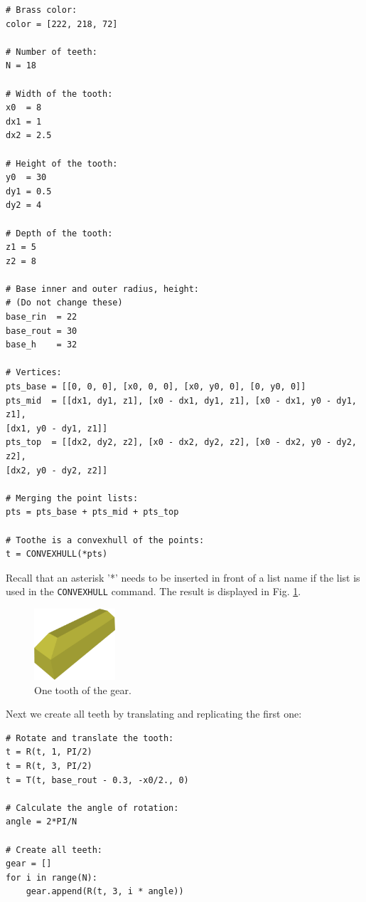 {\small
\begin{bbox}
\begin{verbatim}
# Brass color:
color = [222, 218, 72]

# Number of teeth:
N = 18

# Width of the tooth:
x0  = 8
dx1 = 1
dx2 = 2.5

# Height of the tooth:
y0  = 30
dy1 = 0.5
dy2 = 4

# Depth of the tooth:
z1 = 5
z2 = 8

# Base inner and outer radius, height:
# (Do not change these)
base_rin  = 22
base_rout = 30
base_h    = 32

# Vertices:
pts_base = [[0, 0, 0], [x0, 0, 0], [x0, y0, 0], [0, y0, 0]]
pts_mid  = [[dx1, dy1, z1], [x0 - dx1, dy1, z1], [x0 - dx1, y0 - dy1, z1], 
[dx1, y0 - dy1, z1]]
pts_top  = [[dx2, dy2, z2], [x0 - dx2, dy2, z2], [x0 - dx2, y0 - dy2, z2], 
[dx2, y0 - dy2, z2]]

# Merging the point lists:
pts = pts_base + pts_mid + pts_top

# Toothe is a convexhull of the points:
t = CONVEXHULL(*pts)
\end{verbatim}
\end{bbox}
}
\vspace{6mm}

\noindent
{}
\noindent
Recall that an asterisk '*' needs to be inserted in front of a list 
name if the list is used in the {\tt CONVEXHULL} command.
The result is displayed in Fig. \ref{fig:gear-1}.

\begin{figure}[!ht]
\begin{center}
\includegraphics[width=0.27\textwidth]{img/gear-1.png}
\end{center}
\vspace{-4mm}
\caption{One tooth of the gear.}
\label{fig:gear-1}
\end{figure}
\noindent
Next we create all teeth by translating and replicating the first one:\\

{\small
\begin{bbox}
\begin{verbatim}
# Rotate and translate the tooth:
t = R(t, 1, PI/2)
t = R(t, 3, PI/2)
t = T(t, base_rout - 0.3, -x0/2., 0)

# Calculate the angle of rotation:
angle = 2*PI/N

# Create all teeth:
gear = []
for i in range(N):
    gear.append(R(t, 3, i * angle))
\end{verbatim}
\end{bbox}
}
\vspace{6mm}


